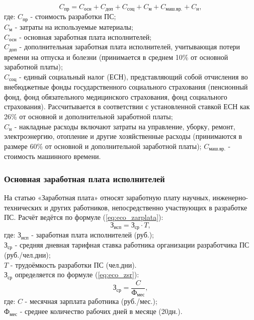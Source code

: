 \begin{equation}
C_{\mbox{пр}} = C_{\mbox{осн}} + C_{\mbox{доп}} + C_{\mbox{соц}} + C_{\mbox{м}} + C_{\mbox{маш.вр.}} + C_{\mbox{н}},
\label{eq:eco_smeta}
\end{equation}
где:	${C_{\mbox{пр}}}$ - стоимость разработки ПС; \\
	${C_{\mbox{м}}}$ - затраты на используемые материалы; \\
	${C_{\mbox{осн}}}$ - основная заработная плата исполнителей; \\
	${C_{\mbox{доп}}}$ - дополнительная заработная плата исполнителей, учитывающая потери времени на отпуска и болезни
		(принимается в среднем 10\% от основной заработной платы); \\
	${C_{\mbox{соц}}}$ - единый социальный налог (ЕСН), представляющий собой отчисления во внебюджетные фонды
		государственного социального страхования (пенсионный фонд, фонд обязательного медицинского страхования,
		фонд социального страхования). Рассчитывается в соответствии с установленной ставкой ЕСН как 26\% от
		основной и дополнительной заработной платы; \\
	${C_{\mbox{н}}}$ - накладные расходы включают затраты на управление, уборку, ремонт, электроэнергию, отопление и
		другие хозяйственные расходы (принимаются в размере 60\% от основной и дополнительной заработной платы);
	${C_{\mbox{маш.вр.}}}$ - стоимость машинного времени. \\

\subsubsection*{Основная заработная плата исполнителей}
На статью «Заработная плата» относят заработную плату научных, инженерно-технических и других работников,
непосредственно участвующих в разработке ПС. Расчёт ведётся по формуле (\ref{eq:eco_zarplata}):
\begin{equation}
\mbox{З}_{\mbox{исп}} = \mbox{З}_{\mbox{ср}} \cdot{T},
\label{eq:eco_zarplata}
\end{equation}
где:	${\mbox{З}_{\mbox{исп}}}$ - заработная плата исполнителей (руб.); \\
	${\mbox{З}_{\mbox{ср}}}$ -  средняя дневная тарифная ставка работника организации разработчика ПС (руб./чел.дни); \\
	${T}$ - трудоёмкость разработки ПС (чел.дни). \\

${\mbox{З}_{\mbox{ср}}}$ определяется по формуле (\ref{eq:eco_zsr}):
\begin{equation}
\mbox{З}_{\mbox{ср}} = \frac{C}{\mbox{Ф}_{\mbox{мес}}},
\label{eq:eco_zsr}
\end{equation}
где:	${C}$ - месячная зарплата работника (руб./мес.); \\
	${\mbox{Ф}_{\mbox{мес}}}$ - среднее количество рабочих дней в месяце (20дн.). \\

